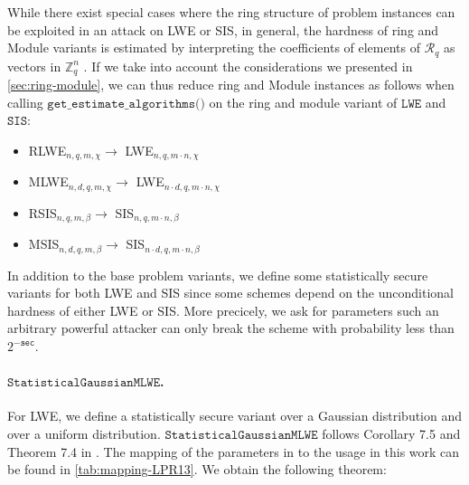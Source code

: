 While there exist special cases where the ring structure of problem instances can be exploited in an attack on LWE or SIS, %
in general, the hardness of ring and Module variants is estimated by interpreting the coefficients of elements of $\mathcal{R}_q$ as vectors in $\mathbb{Z}_q^n$ \cite{ACDDPPVW18}. If we take into account the considerations we presented in \cref{sec:ring-module}, we can thus reduce ring and Module instances as follows when calling $\texttt{get\_estimate\_algorithms()}$ on the ring and module variant of $\texttt{LWE}$ and $\texttt{SIS}$:
\begin{itemize}
    \item RLWE$_{n, q, m, \chi} \longrightarrow$ LWE$_{n, q, m \cdot n, \chi}$
    \item MLWE$_{n, d, q, m, \chi} \longrightarrow$ LWE$_{n \cdot d, q, m \cdot n, \chi}$
    \item RSIS$_{n, q, m, \beta} \longrightarrow$ SIS$_{n, q, m \cdot n, \beta}$
    \item MSIS$_{n, d, q, m, \beta} \longrightarrow$ SIS$_{n \cdot d, q, m \cdot n, \beta}$
\end{itemize}


In addition to the base problem variants, we define some statistically secure variants for both LWE and SIS since some schemes depend on the unconditional hardness of either LWE or SIS. More precicely, we ask for parameters such an arbitrary powerful attacker can only break the scheme with probability less than $2^{-\texttt{sec}}$.

\paragraph{$\texttt{StatisticalGaussianMLWE}$.} For LWE, we define a statistically secure variant over a Gaussian distribution and over a uniform distribution. $\texttt{StatisticalGaussianMLWE}$ follows Corollary 7.5 and Theorem 7.4 in \cite{LPR13}. The mapping of the parameters in \cite{LPR13} to the usage in this work can be found in \cref{tab:mapping-LPR13}. We obtain the following theorem:

